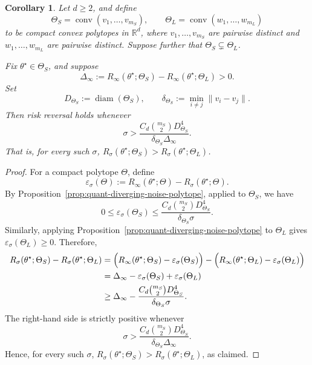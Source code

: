 \documentclass[11pt]{article}
\theoremstyle{plain}
\newtheorem{corollary}[theorem]{Corollary}
\theoremstyle{definition}
\providecommand{\mathbbm}{\mathbb} %
\newcommand{\R}{\mathbbm{R}}
\begin{document}
\begin{corollary}
\label{cor:quant-threshold-polytope}
Let $d\ge2$, and define
\[
    \Theta_S=\operatorname{conv}(v_1,\ldots,v_{m_S}),
    \qquad
    \Theta_L=\operatorname{conv}(w_1,\ldots,w_{m_L})
\]
to be compact convex polytopes in $\R^d$, where
$v_1,\ldots,v_{m_S}$ are pairwise distinct and
$w_1,\ldots,w_{m_L}$ are pairwise distinct. Suppose further that $\Theta_S\subsetneq\Theta_L$.

Fix
$\theta^\star\in\Theta_S$, and suppose
\[
    \Delta_\infty
    :=
    R_\infty(\theta^\star;\Theta_S)
    -
    R_\infty(\theta^\star;\Theta_L)
    >
    0.
\]
Set
\[
    D_{\Theta_S}:=\operatorname{diam}(\Theta_S),
    \qquad
    \delta_{\Theta_S}:=\min_{i\neq j}\|v_i-v_j\|.
\]
Then risk reversal holds whenever
\[
    \sigma
    >
    \frac{
        C_d \binom{m_S}{2} D_{\Theta_S}^4
    }{
        \delta_{\Theta_S}\Delta_\infty
    }.
\]
That is, for every such $\sigma$, $R_\sigma(\theta^\star;\Theta_S) >R_\sigma(\theta^\star;\Theta_L)$.
\end{corollary}
\begin{proof}
For a compact polytope $\Theta$, define
\[
    \varepsilon_\sigma(\Theta)
    :=
    R_\infty(\theta^\star;\Theta)
    -
    R_\sigma(\theta^\star;\Theta).
\]
By Proposition~\ref{prop:quant-diverging-noise-polytope}, applied to
$\Theta_S$, we have
\[
    0
    \le
    \varepsilon_\sigma(\Theta_S)
    \le
    \frac{
        C_d \binom{m_S}{2}D_{\Theta_S}^4
    }{
        \delta_{\Theta_S}\sigma
    }.
\]
Similarly, applying Proposition~\ref{prop:quant-diverging-noise-polytope} to
$\Theta_L$ gives $\varepsilon_\sigma(\Theta_L)\ge 0$. Therefore,
\begin{align*}
    R_\sigma(\theta^\star;\Theta_S)
    -
    R_\sigma(\theta^\star;\Theta_L)
    &=
    \Bigl(R_\infty(\theta^\star;\Theta_S)
    -
    \varepsilon_\sigma(\Theta_S)\Bigr)
    -
    \Bigl(R_\infty(\theta^\star;\Theta_L)
    -
    \varepsilon_\sigma(\Theta_L)\Bigr) \\
    &=
    \Delta_\infty
    -
    \varepsilon_\sigma(\Theta_S)
    +
    \varepsilon_\sigma(\Theta_L) \\
    &\ge
    \Delta_\infty
    -
    \frac{
        C_d \binom{m_S}{2}D_{\Theta_S}^4
    }{
        \delta_{\Theta_S}\sigma
    }.
\end{align*}
The right-hand side is strictly positive whenever
\[
    \sigma
    >
    \frac{
        C_d \binom{m_S}{2}D_{\Theta_S}^4
    }{
        \delta_{\Theta_S}\Delta_\infty
    }.
\]
Hence, for every such $\sigma$, $R_\sigma(\theta^\star;\Theta_S)
    >
    R_\sigma(\theta^\star;\Theta_L)$, as claimed.
\end{proof}



\end{document}
